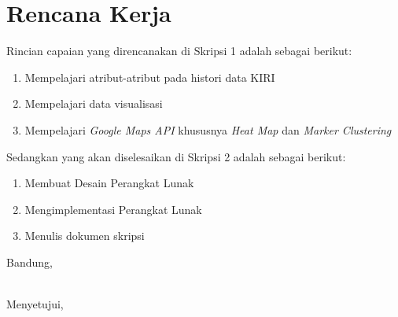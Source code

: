 \documentclass[a4paper,twoside]{article}
\begin{document}
\section{Rencana Kerja}
Rincian capaian yang direncanakan di Skripsi 1 adalah sebagai berikut:
\begin{enumerate}
		\item Mempelajari atribut-atribut pada histori data KIRI
		\item Mempelajari data visualisasi
		\item Mempelajari \textit{Google Maps API } khususnya \textit{Heat Map} dan \textit{Marker Clustering}
\end{enumerate}

Sedangkan yang akan diselesaikan di Skripsi 2 adalah sebagai berikut:
\begin{enumerate}
		\item Membuat Desain Perangkat Lunak
		\item Mengimplementasi Perangkat Lunak
		\item Menulis dokumen skripsi
\end{enumerate}

\newpage
\vspace{1cm}
\centering Bandung, \tanggal\\
\vspace{2cm} \nama \\ 
\vspace{1cm}

Menyetujui, \\
\end{document}
